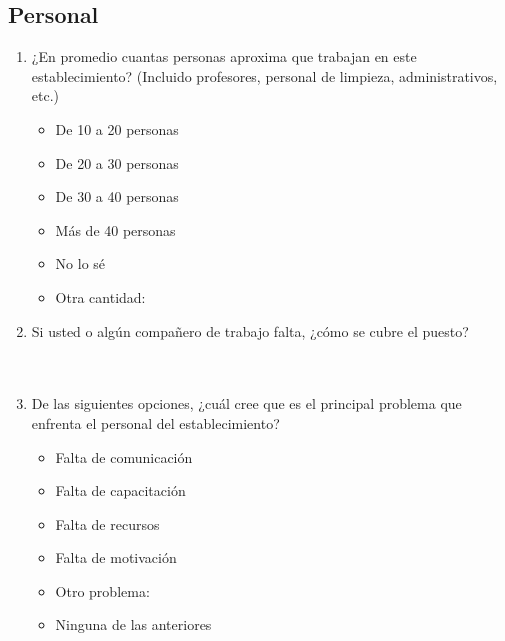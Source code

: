 \documentclass{article}
\begin{document}
\subsection*{Personal}
\begin{enumerate}
    \item ¿En promedio cuantas personas aproxima que trabajan en este establecimiento? (Incluido profesores, personal de limpieza, administrativos, etc.)
    \begin{itemize}[label=$\square$]
        \item De 10 a 20 personas
        \item De 20 a 30 personas
        \item De 30 a 40 personas
        \item Más de 40 personas
        \item No lo sé
        \item Otra cantidad: \underline{\hspace{0.5\linewidth}}
    \end{itemize}
    \item Si usted o algún compañero de trabajo falta, ¿cómo se cubre el puesto? \\[0.5cm]
    \underline{\hspace{0.95\linewidth}} \vspace{0.3cm} \\
    \underline{\hspace{0.95\linewidth}} \vspace{0.3cm} \\
    \underline{\hspace{0.95\linewidth}} \vspace{0.3cm}
    \item De las siguientes opciones, ¿cuál cree que es el principal problema que enfrenta el personal del establecimiento?
    \begin{itemize}[label=$\square$]
        \item Falta de comunicación
        \item Falta de capacitación
        \item Falta de recursos
        \item Falta de motivación
        \item Otro problema: \underline{\hspace{0.5\linewidth}}
        \item Ninguna de las anteriores
    \end{itemize}

\end{enumerate}
\end{document}
